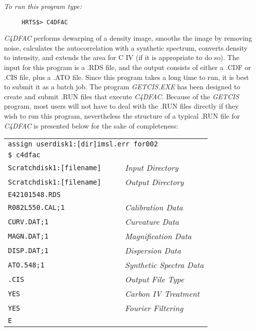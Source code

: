 {\em To run this program type:}
\begin{verbatim}
     HRTS$> C4DFAC
\end{verbatim}
{\em C4DFAC} performs dewarping of a density image, smooths the image by
   removing noise, calculates the autocorrelation with a synthetic
   spectrum, converts density to intensity, and extends the area for C IV
   (if it is appropriate to do so).  The input for this program is a .RDS
   file, and the output consists of either a .CDF or .CIS file, plus a
   .ATO file.  Since this program takes a long time to run, it is best to
   submit it as a batch job.  The program {\em GETCIS.EXE} has been designed to
   create and submit .RUN files that execute {\em C4DFAC.}  Because of the
{\em GETCIS} program, most users will not have to deal with the .RUN files
   directly if they wish to run this program, nevertheless the structure
   of a typical .RUN file for {\em C4DFAC} is presented below for the sake of
   completeness:
\begin{center}
\begin{tabular}{||l l l l l||}
\hline
\multicolumn{5}{||l||}{\tt assign userdisk1:[dir]imsl.err for002} \\
{\tt \$ c4dfac} & & & & \\
{\tt Scratchdisk1:[filename]} &  &  &  \multicolumn{2}{l||}{\em Input Directory}
 \\
{\tt Scratchdisk1:[filename]} &  &  &  \multicolumn{2}{l||}{\em Output
Directory} \\
\hline
{\tt E42101548.RDS} &  &  &  &  \\
{\tt R082L550.CAL;1} &  &  &  \multicolumn{2}{l||}{\em Calibration Data} \\
{\tt CURV.DAT;1} &  &  &  \multicolumn{2}{l||}{\em Curvature Data} \\
{\tt MAGN.DAT;1} &  &  &  \multicolumn{2}{l||}{\em Magnification Data} \\
{\tt DISP.DAT;1} &  &  &  \multicolumn{2}{l||}{\em Dispersion Data} \\
{\tt ATO.548;1}  &  &  &  \multicolumn{2}{l||}{\em Synthetic Spectra Data} \\
{\tt .CIS} &  &  &  \multicolumn{2}{l||}{\em Output File Type} \\
{\tt YES}  &  &  &  \multicolumn{2}{l||}{\em Carbon IV Treatment} \\
{\tt YES}  &  &  &  \multicolumn{2}{l||}{\em Fourier Filtering} \\
\hline
{\tt E} &  &  &  &  \\
\hline
\end{tabular}
\end{center}

